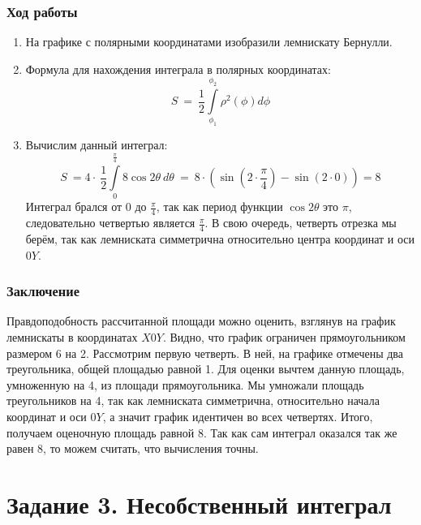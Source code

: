 \documentclass{article}
\begin{document}
\subsubsection*{Ход работы}

\begin{enumerate}
    \item На графике с полярными координатами изобразили лемнискату Бернулли.
    
    \item Формула для нахождения интеграла в полярных координатах:
    $$
    S\ =\ \frac{1}{2}\int\limits_{\phi_{1}}^{\phi_{2}}\rho^{2}\left(\phi\right)d\phi$$
    
    \item Вычислим данный интеграл:
    $$
    S\ =4\cdot\ \frac{1}{2}\int\limits_{0}^{\frac{\pi}{4}}8\cos2\theta\ d\theta\ =\ 8\cdot\left(\sin\left(2\cdot\frac{\pi}{4}\right)-\sin\left(2\cdot0\right)\right)=8
    $$
    Интеграл брался от 0 до $\frac{\pi}{4}$, так как период функции $\cos2\theta$ это $\pi$, следовательно четвертью является $\frac{\pi}{4}$. В свою очередь, четверть отрезка мы берём, так как лемниската симметрична относительно центра координат и оси $0Y$.

    
\end{enumerate}

\subsubsection*{Заключение}

Правдоподобность рассчитанной площади можно оценить, взглянув на график лемнискаты в координатах $X0Y$. Видно, что график ограничен прямоугольником размером 6 на 2. Рассмотрим первую четверть. В ней, на графике отмечены два треугольника, общей площадью равной 1. Для оценки вычтем данную площадь, умноженную на 4, из площади прямоугольника. Мы умножали площадь треугольников на 4, так как лемниската симметрична, относительно начала координат и оси $0Y$, а значит график идентичен во всех четвертях. Итого, получаем оценочную площадь равной 8. Так как сам интеграл оказался так же равен 8, то можем считать, что вычисления точны.

\newpage


\section{Задание 3. Несобственный интеграл}
\end{document}

